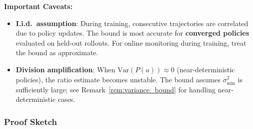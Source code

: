 \textbf{Important Caveats:}
\begin{itemize}
    \item \textbf{I.i.d.\ assumption}: During training, consecutive trajectories are correlated due to policy updates. The bound is most accurate for \textbf{converged policies} evaluated on held-out rollouts. For online monitoring during training, treat the bound as approximate.
    \item \textbf{Division amplification}: When $\text{Var}(P(a)) \approx 0$ (near-deterministic policies), the ratio estimate becomes unstable. The bound assumes $\sigma^2_{\min}$ is sufficiently large; see Remark~\ref{rem:variance_bound} for handling near-deterministic cases.
\end{itemize}

\subsubsection{Proof Sketch}

